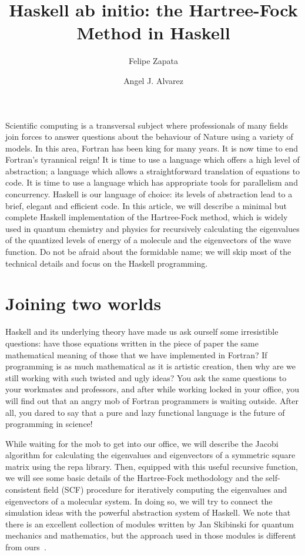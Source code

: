 \documentclass{tmr}
\title{Haskell ab initio: the Hartree-Fock Method in Haskell}
\author{Felipe Zapata\email{felipe.zapata@edu.uah.es}}
\author{Angel J. Alvarez\email{a.alvarez@uah.es}}
\begin{document}
\begin{introduction}

Scientific computing is a transversal subject where professionals of
many fields join forces to answer questions about the behaviour of
Nature using a variety of models.
%
In this area, Fortran has been king for many years.
%
It is now time to end Fortran's tyrannical reign!
%
It is time to use a language which offers a high level of abstraction; a
language which allows a straightforward translation of equations to code.
%
It is time to use a language which has appropriate tools for parallelism
and concurrency.
%
Haskell is our language of choice: its levels of abstraction lead to a
brief, elegant and efficient code.
%
In this article, we will describe a minimal but complete Haskell
implementation of the Hartree-Fock method, which is widely used in
quantum chemistry and physics for recursively calculating the
eigenvalues of the quantized levels of energy of a molecule and the
eigenvectors of the wave function.
%
Do not be afraid about the formidable name; we will skip most of the
technical details and focus on the Haskell programming.

\end{introduction}


\section{Joining two worlds}

Haskell and its underlying theory have made us ask ourself some
irresistible questions: have those equations written in the piece of
paper the same mathematical meaning of those that we have implemented in
Fortran?
%
If programming is as much mathematical as it is artistic creation, then
why are we still working with such twisted and ugly ideas?
%
You ask the same questions to your workmates and professors, and after
while working locked in your office, you will find out that an angry mob
of Fortran programmers is waiting outside.
%
After all, you dared to say that a pure and lazy functional language is
the future of programming in science!

While waiting for the mob to get into our office, we will describe the
Jacobi algorithm for calculating the eigenvalues and eigenvectors of a
symmetric square matrix using the repa library.
%
Then, equipped with this useful recursive function, we will see some
basic details of the Hartree-Fock methodology and the self-consistent
field (SCF) procedure for iteratively computing the eigenvalues and
eigenvectors of a molecular system.
%
In doing so, we will try to connect the simulation ideas with 
the powerful abstraction system of Haskell.
%
We note that there is an excellent collection of modules written by Jan
Skibinski for quantum mechanics and mathematics, but the approach used
in those modules is different from ours~\cite{Skibinski}.
\end{document}
